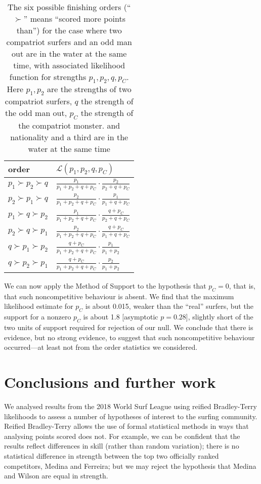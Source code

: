 \documentclass{article}
\begin{document}
\begin{table}
\begin{tabular}{l|l}
order  & ${\mathcal L}(p_1,p_2,q,p_C)$\\ \hline
$p_1\succ p_2\succ q $ & $ \frac{p_1}{p_1+p_2+q+p_C}\cdot\frac{p_2}{p_2+q+p_C}$\\
$p_2\succ p_1\succ q $ & $ \frac{p_2}{p_1+p_2+q+p_C}\cdot\frac{p_1}{p_1+q+p_C}$\\
$p_1\succ q\succ p_2 $ & $ \frac{p_1}{p_1+p_2+q+p_C}\cdot\frac{q+p_C}{p_2+q+p_C}$\\
$p_2\succ q\succ p_1 $ & $ \frac{p_2}{p_1+p_2+q+p_C}\cdot\frac{q+p_C}{p_1+q+p_C}$\\
$q\succ p_1\succ p_2 $ & $ \frac{q+p_C}{p_1+p_2+q+p_C}\cdot\frac{p_1}{p_1+p_2}$\\
$q\succ p_2\succ p_1 $ & $ \frac{q+p_C}{p_1+p_2+q+p_C}\cdot\frac{p_2}{p_1+p_2}$\\
\end{tabular}
\caption{The \label{likelihoodcompatriot} six possible finishing
  orders (``$\succ$'' means ``scored more points than'') for the case
  where two compatriot surfers and an odd man out are in the water at
  the same time, with associated likelihood function for strengths
  $p_1,p_2,q, p_C$.  Here $p_1,p_2$ are the strengths of two
  compatriot surfers, $q$ the strength of the odd man out, $p_C$ the
  strength of the compatriot monster. and nationality and a third are
  in the water at the same time}
\end{table}

We can now apply the Method of Support to the hypothesis that $p_C=0$,
that is, that such noncompetitive behaviour is absent.  We find that
the maximum likelihood estimate for $p_C$ is about 0.015, weaker than
the ``real'' surfers, but the support for a nonzero $p_C$ is about 1.8
[asymptotic $p=0.28$], slightly short of the two units of support
required for rejection of our null.  We conclude that there is
evidence, but no strong evidence, to suggest that such noncompetitive
behaviour occurred---at least not from the order statistics we
considered.

\section{Conclusions and further work}

We analysed results from the 2018 World Surf League using reified
Bradley-Terry likelihoods to assess a number of hypotheses of interest
to the surfing community.  Reified Bradley-Terry allows the use of
formal statistical methods in ways that analysing points scored does
not.  For example, we can be confident that the results reflect
differences in skill (rather than random variation); there is no
statistical difference in strength between the top two officially
ranked competitors, Medina and Ferreira; but we may reject the
hypothesis that Medina and Wilson are equal in strength.
\end{document}
